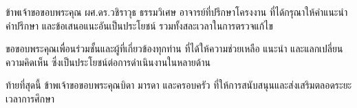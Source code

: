 ข้าพเจ้าขอขอบพระคุณ ผศ.ดร.วชิราวุธ ธรรมวิเศษ อาจารย์ที่ปรึกษาโครงงาน
ที่ได้กรุณาให้คำแนะนำ คำปรึกษา และข้อเสนอแนะอันเป็นประโยชน์
รวมทั้งสละเวลาในการตรวจแก้ไข

ขอขอบพระคุณเพื่อนร่วมชั้นและผู้ที่เกี่ยวข้องทุกท่าน
ที่ได้ให้ความช่วยเหลือ แนะนำ และแลกเปลี่ยนความคิดเห็น
ซึ่งเป็นประโยชน์ต่อการดำเนินงานในหลายด้าน

ท้ายที่สุดนี้ ข้าพเจ้าขอขอบพระคุณบิดา มารดา และครอบครัว
ที่ให้การสนับสนุนและส่งเสริมตลอดระยะเวลาการศึกษา
